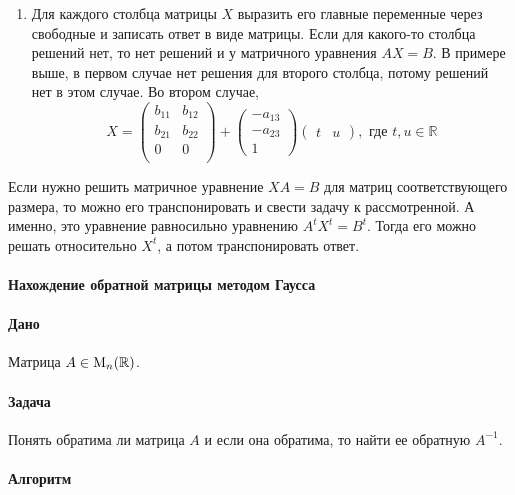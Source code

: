 \begin{enumerate}
\item Для каждого столбца матрицы $X$ выразить его главные переменные через свободные и записать ответ в виде матрицы.
Если для какого-то столбца решений  нет, то нет решений и у матричного уравнения $AX = B$.
В примере выше, в первом случае нет решения для второго столбца, потому решений нет в этом случае.
Во втором случае, 
\[
X = 
\begin{pmatrix}
{b_{11}}&{b_{12}}\\
{b_{21}}&{b_{22}}\\
{0}&{0}\\
\end{pmatrix}
+
\begin{pmatrix}
{-a_{13}}\\{-a_{23}}\\{1}
\end{pmatrix}
\begin{pmatrix}
{t}&{u}
\end{pmatrix},\text{ где } t,u\in \mathbb R
\]
\end{enumerate}

Если нужно решить матричное уравнение $XA = B$ для матриц соответствующего размера, то можно его транспонировать и свести задачу к рассмотренной.
А именно, это уравнение равносильно уравнению $A^t X^t = B^t$.
Тогда его можно решать относительно $X^t$, а потом транспонировать ответ.

\paragraph{Нахождение обратной матрицы методом Гаусса}

\paragraph{Дано}

Матрица $A\in \operatorname{M}_{n}(\mathbb R)$.

\paragraph{Задача}

Понять обратима ли матрица $A$ и если она обратима, то найти ее обратную $A^{-1}$.

\paragraph{Алгоритм} 


